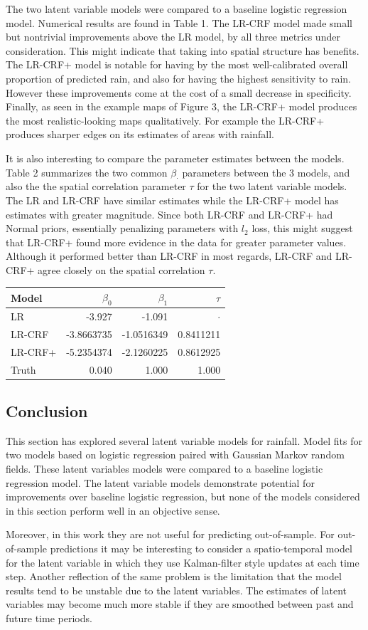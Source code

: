The two latent variable models were compared to a baseline logistic regression model. Numerical results are found in Table 1. The LR-CRF model made small but nontrivial improvements above the LR model, by all three metrics under consideration. This might indicate that taking into spatial structure has benefits. The LR-CRF+ model is notable for having by the most well-calibrated overall proportion of predicted rain, and also for having the highest sensitivity to rain. However these improvements come at the cost of a small decrease in specificity. Finally, as seen in the example maps of Figure 3, the LR-CRF+ model produces the most realistic-looking maps qualitatively. For example the LR-CRF+ produces sharper edges on its estimates of areas with rainfall.

It is also interesting to compare the parameter estimates between the models. Table 2 summarizes the two common $\beta_\cdot$ parameters between the 3 models, and also the the spatial correlation parameter $\tau$ for the two latent variable models. The LR and LR-CRF have similar estimates while the LR-CRF+ model has estimates with greater magnitude. Since both LR-CRF and LR-CRF+ had Normal priors, essentially penalizing parameters with $l_2$ loss, this might suggest that LR-CRF+ found more evidence in the data for greater parameter values. Although it performed better than LR-CRF in most regards, LR-CRF and LR-CRF+ agree closely on the spatial correlation $\tau$. 

\begin{table}[ht]
\centering
\begin{tabular}{lrrr}
  \hline
Model & $\beta_0$ & $\beta_1$ & $\tau$ \\ 
  \hline
LR & -3.927 & -1.091 & $\cdot$ \\ 
LR-CRF & -3.8663735 & -1.0516349 & 0.8411211 \\ 
LR-CRF+ & -5.2354374 & -2.1260225  &  0.8612925 \\ 
   \hline
   Truth & 0.040 & 1.000 & 1.000
\end{tabular}
\end{table}

\subsection{Conclusion}
This section has explored several latent variable models for rainfall. Model fits for two models based on logistic regression paired with Gaussian Markov random fields. These latent variables models were compared to a baseline logistic regression model. The latent variable models demonstrate potential for improvements over baseline logistic regression, but none of the models considered in this section perform well in an objective sense.

Moreover, in this work they are not useful for predicting out-of-sample. For out-of-sample predictions it may be interesting to consider a spatio-temporal model for the latent variable in which they use Kalman-filter style updates at each time step. Another reflection of the same problem is the limitation that the model results tend to be unstable due to the latent variables. The estimates of latent variables may become much more stable if they are smoothed between past and future time periods.